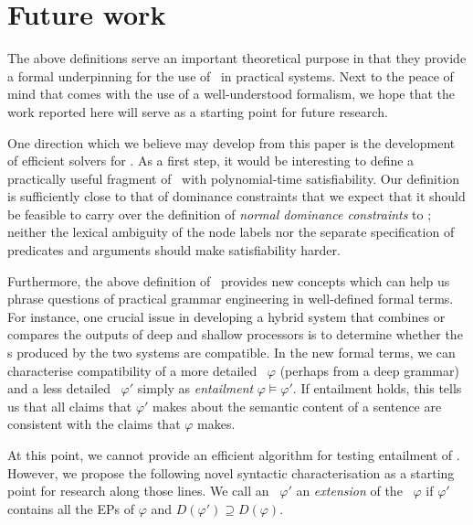 \section{Future work}
\label{sec:entailment}

The above definitions serve an important theoretical purpose in that
they provide a formal underpinning for the use of \rmrs\ in practical
systems.  Next to the peace of mind that comes with the use of a
well-understood formalism, we hope that the work reported here will
serve as a starting point for future research.

One direction which we believe may develop from this paper is the
development of efficient solvers for \rmrs.  As a first step, it would
be interesting to define a practically useful fragment of \rmrs\ with
polynomial-time satisfiability.  Our definition is sufficiently close
to that of dominance constraints that we expect that it should be
feasible to carry over the definition of \emph{normal dominance
  constraints} \cite{Althaus_etal:JoA} to \rmrs; neither the lexical
ambiguity of the node labels nor the separate specification of
predicates and arguments should make satisfiability harder.

Furthermore, the above definition of \rmrs\ provides new concepts
which can help us phrase questions of practical grammar engineering in
well-defined formal terms.  For instance, one crucial issue in
developing a hybrid system that combines or compares the outputs of
deep and shallow processors is to determine whether the \rmrs s
produced by the two systems are compatible.  In the new formal terms,
we can characterise compatibility of a more detailed \rmrs\ $\varphi$
(perhaps from a deep grammar) and a less detailed \rmrs\ $\varphi'$
simply as \emph{entailment} $\varphi \models \varphi'$.  If entailment
holds, this tells us that all claims that $\varphi'$ makes about the
semantic content of a sentence are consistent with the claims that
$\varphi$ makes.

At this point, we cannot provide an efficient algorithm for testing
entailment of \rmrs.  However, we propose the following novel
syntactic characterisation as a starting point for research along
those lines. We call an \rmrs\ $\varphi'$ an \emph{extension} of the
\rmrs\ $\varphi$ if $\varphi'$ contains all the EPs of $\varphi$ and
$D(\varphi') \supseteq D(\varphi)$.

